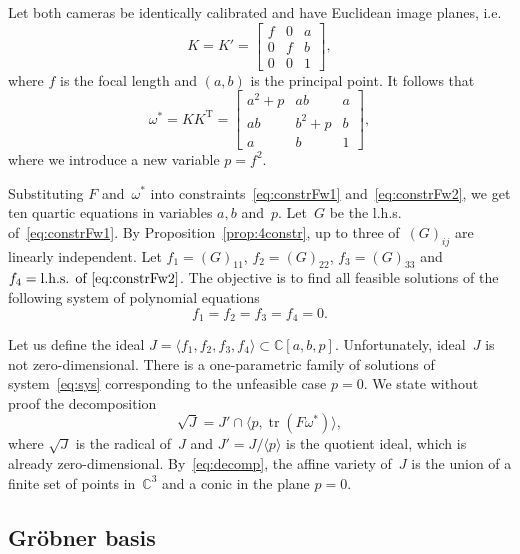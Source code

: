 \documentclass[reqno]{amsart}
\DeclareMathOperator{\tr}{tr}
\theoremstyle{plain}
\begin{document}
Let both cameras be identically calibrated and have Euclidean image planes, i.e.
\begin{equation}
K = K' = \begin{bmatrix}f & 0 & a\\ 0 & f & b\\ 0 & 0 & 1\end{bmatrix},
\end{equation}
where $f$ is the focal length and $(a, b)$ is the principal point. It follows that
\begin{equation}
\omega^* = KK^{\mathrm T} = \begin{bmatrix}a^2 + p & ab & a\\ ab & b^2 + p & b\\ a & b & 1\end{bmatrix},
\end{equation}
where we introduce a new variable $p = f^2$.

Substituting $F$ and~$\omega^*$ into constraints~\eqref{eq:constrFw1} and~\eqref{eq:constrFw2}, we get ten quartic equations in variables $a, b$ and~$p$. Let~$G$ be the l.h.s. of~\eqref{eq:constrFw1}. By Proposition~\ref{prop:4constr}, up to three of~$(G)_{ij}$ are linearly independent. Let $f_1 = (G)_{11}$, $f_2 = (G)_{22}$, $f_3 = (G)_{33}$ and $f_4 = \text{l.h.s. of~\eqref{eq:constrFw2}}$. The objective is to find all feasible solutions of the following system of polynomial equations
\begin{equation}
\label{eq:sys}
f_1 = f_2 = f_3 = f_4 = 0.
\end{equation}

Let us define the ideal $J = \langle f_1, f_2, f_3, f_4 \rangle \subset \mathbb C[a, b, p]$. Unfortunately, ideal~$J$ is not zero-dimensional. There is a one-parametric family of solutions of system~\eqref{eq:sys} corresponding to the unfeasible case $p = 0$. We state without proof the decomposition
\begin{equation}
\label{eq:decomp}
\sqrt J = J' \cap \langle p, \tr(F\omega^*)\rangle,
\end{equation}
where $\sqrt J$ is the radical of~$J$ and $J' = J/\langle p \rangle$ is the quotient ideal, which is already zero-dimensional. By~\eqref{eq:decomp}, the affine variety of~$J$ is the union of a finite set of points in~$\mathbb C^3$ and a conic in the plane $p = 0$.


\subsection{Gr\"{o}bner basis}
\end{document}

